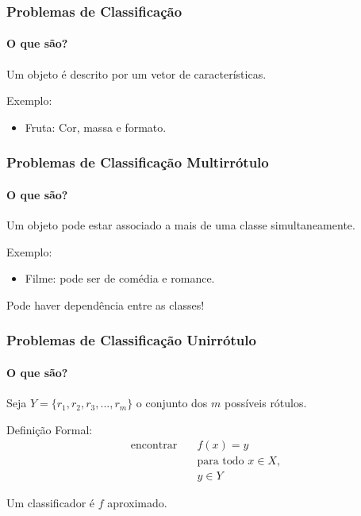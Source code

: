 \documentclass[10pt,fleqn]{beamer}
\begin{document}
\begin{frame}
  \frametitle{Problemas de Classificação}
  \framesubtitle{O que são?}
  
  Um objeto é descrito por um vetor de características.
  
    \begin{exampleblock}{Exemplo:}
  \begin{itemize}
   \item Fruta: Cor, massa e formato.
  \end{itemize}
  
 \end{exampleblock}
\end{frame}

\begin{frame}
  \frametitle{Problemas de Classificação Multirrótulo}
  \framesubtitle{O que são?}
  
  Um objeto pode estar associado a mais de uma classe simultaneamente.
  
    \begin{exampleblock}{Exemplo:}
  \begin{itemize}
   \item Filme: pode ser de comédia e romance.
  \end{itemize} 
  
 \end{exampleblock}
 Pode haver dependência entre as classes!
\end{frame}


\begin{frame}
  \frametitle{Problemas de Classificação Unirrótulo}
  \framesubtitle{O que são?}
  
  Seja $Y=\{r_1,r_2,r_3,...,r_m\}$ o conjunto dos $m$ possíveis rótulos.
  \begin{block}{Definição Formal:}
  \begin{align}
    \textrm{encontrar}
      \quad & f(x)=y \\
  	  \quad & \textrm{para todo }x \in X, \nonumber \\
  	  \quad & y\in Y
	  \nonumber
  \end{align}
  \end{block}
  
  Um classificador é $f$ aproximado.
  
\end{frame}
\end{document}
